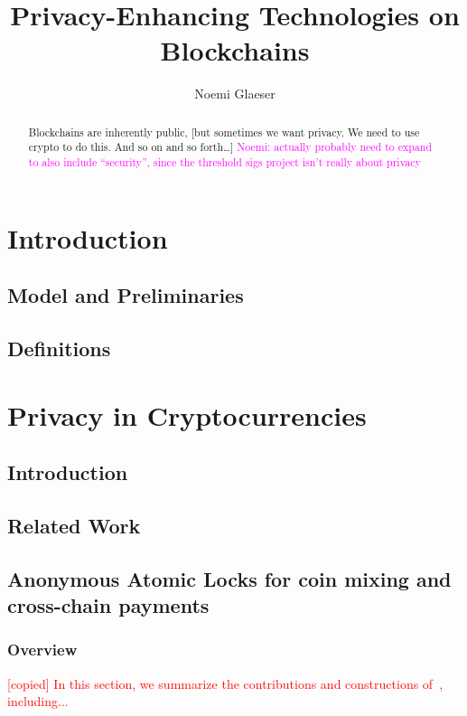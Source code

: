 \documentclass{article}
\title{Privacy-Enhancing Technologies on Blockchains}
\author{Noemi Glaeser}
\date{}
\newcommand{\copied}[1]{\textcolor{red}{[copied] #1}}
\newcommand{\noemi}[1]{\textcolor{magenta}{Noemi: #1}}
\begin{document}
\maketitle
\begin{abstract}
Blockchains are inherently public, [but sometimes we want privacy. We need to use crypto to do this. And so on and so forth\dots] \noemi{actually probably need to expand to also include ``security'', since the threshold sigs project isn't really about privacy}
\end{abstract}

\tableofcontents

\section{Introduction}
\subsection{Model and Preliminaries}
\subsection{Definitions}

\section{Privacy in Cryptocurrencies}\label{main}

\subsection{Introduction}
\subsection{Related Work}

\subsection{Anonymous Atomic Locks for coin mixing and cross-chain payments}
\subsubsection{Overview}
\copied{In this section, we summarize the contributions and constructions of~\cite{CCS:GMMMTT22}, including...}
\end{document}
